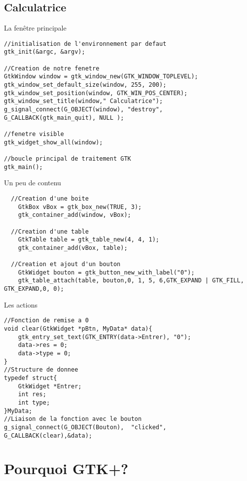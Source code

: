 \documentclass{beamer}
\begin{document}
  \subsection{Calculatrice}
  \begin{frame}[containsverbatim]{La fenêtre principale}
  \begin{lstlisting}
//initialisation de l'environnement par defaut
gtk_init(&argc, &argv);

//Creation de notre fenetre
GtkWindow window = gtk_window_new(GTK_WINDOW_TOPLEVEL);
gtk_window_set_default_size(window, 255, 200);
gtk_window_set_position(window, GTK_WIN_POS_CENTER);
gtk_window_set_title(window," Calculatrice");
g_signal_connect(G_OBJECT(window), "destroy", G_CALLBACK(gtk_main_quit), NULL );

//fenetre visible
gtk_widget_show_all(window);

//boucle principal de traitement GTK
gtk_main();
  \end{lstlisting}
  \end{frame}
  \begin{frame}[containsverbatim]{Un peu de contenu}
  \begin{lstlisting}
  //Creation d'une boite
	GtkBox vBox = gtk_box_new(TRUE, 3);
	gtk_container_add(window, vBox);
	
  //Creation d'une table
	GtkTable table = gtk_table_new(4, 4, 1);
	gtk_container_add(vBox, table);
	
  //Creation et ajout d'un bouton
	GtkWidget bouton = gtk_button_new_with_label("0");
	gtk_table_attach(table, bouton,0, 1, 5, 6,GTK_EXPAND | GTK_FILL, GTK_EXPAND,0, 0);
\end{lstlisting}
  \end{frame}
  \begin{frame}[containsverbatim]{Les actions}
\begin{lstlisting}
//Fonction de remise a 0
void clear(GtkWidget *pBtn, MyData* data){
	gtk_entry_set_text(GTK_ENTRY(data->Entrer), "0");
	data->res = 0;
	data->type = 0;
}
//Structure de donnee
typedef struct{
	GtkWidget *Entrer;
	int res;
	int type;
}MyData;
//Liaison de la fonction avec le bouton
g_signal_connect(G_OBJECT(Bouton),  "clicked", G_CALLBACK(clear),&data);
\end{lstlisting}
  \end{frame}

 \section{Pourquoi GTK+?}
\end{document}
